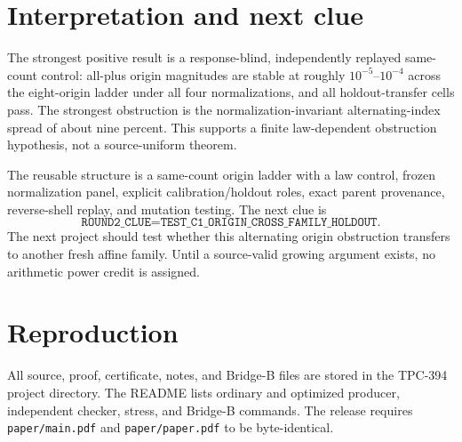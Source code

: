 \documentclass[10pt]{article}
\begin{document}
\section{Interpretation and next clue}

The strongest positive result is a response-blind, independently replayed
same-count control: all-plus origin magnitudes are stable at roughly
$10^{-5}$--$10^{-4}$ across the eight-origin ladder under all four
normalizations, and all holdout-transfer cells pass.  The strongest
obstruction is the normalization-invariant alternating-index spread of about
nine percent.  This supports a finite law-dependent obstruction hypothesis,
not a source-uniform theorem.

The reusable structure is a same-count origin ladder with a law control,
frozen normalization panel, explicit calibration/holdout roles, exact parent
provenance, reverse-shell replay, and mutation testing.  The next clue is
\[
 \texttt{ROUND2\_CLUE=TEST\_C1\_ORIGIN\_CROSS\_FAMILY\_HOLDOUT}.
\]
The next project should test whether this alternating origin obstruction
transfers to another fresh affine family.  Until a source-valid growing
argument exists, no arithmetic power credit is assigned.

\section*{Reproduction}

All source, proof, certificate, notes, and Bridge-B files are stored in the
TPC-394 project directory.  The README lists ordinary and optimized producer,
independent checker, stress, and Bridge-B commands.  The release requires
\texttt{paper/main.pdf} and \texttt{paper/paper.pdf} to be byte-identical.
\end{document}
